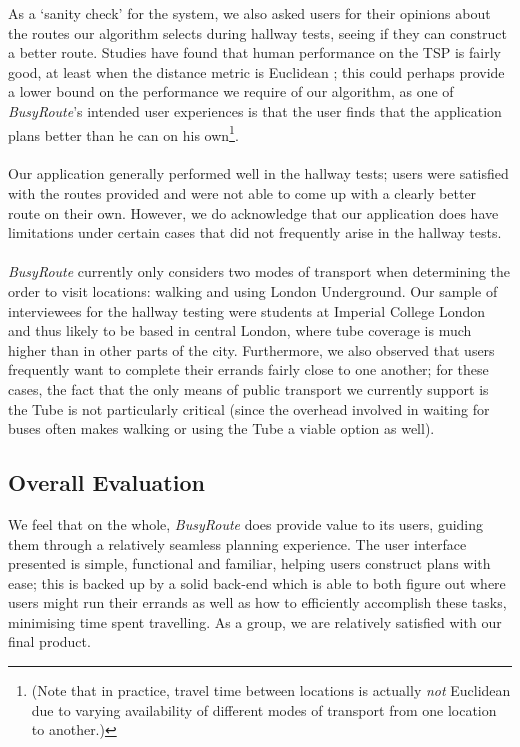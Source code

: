 \documentclass[a4paper, 10pt]{report}
\begin{document}
As a `sanity check' for the system, we also asked users for their opinions about the routes our algorithm selects during hallway tests, seeing if they can construct a better route. Studies have found that human performance on the TSP is fairly good, at least when the distance metric is Euclidean \cite{human-tsp}; this could perhaps provide a lower bound on the performance we require of our algorithm, as one of \textit{BusyRoute}'s intended user experiences is that the user finds that the application plans better than he can on his own\footnote{(Note that in practice, travel time between locations is actually \textit{not} Euclidean due to varying availability of different modes of transport from one location to another.)}. \\\\
Our application generally performed well in the hallway tests; users were satisfied with the routes provided and were not able to come up with a clearly better route on their own. However, we do acknowledge that our application does have limitations under certain cases that did not frequently arise in the hallway tests.
\\\\
\textit{BusyRoute} currently only considers two modes of transport when determining the order to visit locations: walking and using London Underground. Our sample of interviewees for the hallway testing were students at Imperial College London and thus likely to be based in central London, where tube coverage is much higher than in other parts of the city. Furthermore, we also observed that users frequently want to complete their errands fairly close to one another; for these cases, the fact that the only means of public transport we currently support is the Tube is not particularly critical (since the overhead involved in waiting for buses often makes walking or using the Tube a viable option as well).
\subsection{Overall Evaluation}
We feel that on the whole, \textit{BusyRoute} does provide value to its users, guiding them through a relatively seamless planning experience. The user interface presented is simple, functional and familiar, helping users construct plans with ease; this is backed up by a solid back-end which is able to both figure out where users might run their errands as well as how to efficiently accomplish these tasks, minimising time spent travelling. As a group, we are relatively satisfied with our final product.
\end{document}
